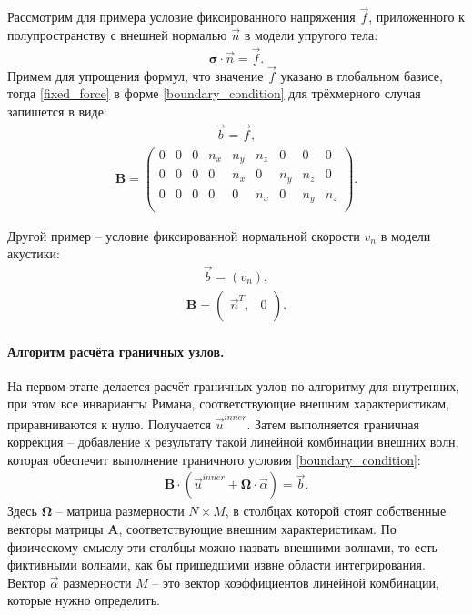 \documentclass[a4paper]{article}
\numberwithin{equation}{section}
\begin{document}
Рассмотрим для примера условие фиксированного напряжения $\vec{f}$, 
приложенного к полупространству с внешней нормалью $\vec{n}$ в модели упругого тела:
\begin{eqnarray}
\label{fixed_force}
	\mathbf{\sigma} \cdot \vec{n} = \vec{f}.
\end{eqnarray}
Примем для упрощения формул, что значение $\vec{f}$ указано в глобальном базисе,
тогда \eqref{fixed_force} в форме \eqref{boundary_condition} 
для трёхмерного случая запишется в виде: 
\begin{eqnarray}
	\vec{b} = \vec{f},
\end{eqnarray}
\begin{align}
\label{fixed_force_global_basis_3D}
	\mathbf{B} =
	\left( \begin{array}{cccccccccccc}
	 0 & 0 & 0 & n_x & n_y & n_z & 0 & 0 & 0 \\
	 0 & 0 & 0 & 0 & n_x & 0 & n_y & n_z & 0 \\
	 0 & 0 & 0 & 0 & 0 & n_x & 0 & n_y & n_z \\
	\end{array} \right).
\end{align}

Другой пример -- условие фиксированной нормальной скорости $v_n$ в модели акустики:
\begin{eqnarray}
	\vec{b} = (v_n),
\end{eqnarray}
\begin{align}
\label{fixed_normal_velocity_acoustic}
	\mathbf{B} =
	\left( \begin{array}{cccccccccccc}
	 \vec{n}^T, & 0 \\
	\end{array} \right).
\end{align}

\paragraph{Алгоритм расчёта граничных узлов.}
\label{sec:good-border-case}
На первом этапе делается расчёт граничных узлов по алгоритму для внутренних, 
при этом все инварианты Римана, соответствующие внешним характеристикам, приравниваются к нулю. 
Получается $\vec{u}^{inner}$. Затем выполняется граничная коррекция -- 
добавление к результату такой линейной комбинации внешних волн, 
которая обеспечит выполнение граничного условия \eqref{boundary_condition}:
\begin{eqnarray}
	\mathbf{B} \cdot (\vec{u}^{inner} + \mathbf{\Omega} \cdot \vec{\alpha}) = \vec{b}.
\end{eqnarray}
Здесь $\mathbf{\Omega}$ -- матрица размерности $N \times M$, 
в столбцах которой стоят собственные векторы 
матрицы $\mathbf{A}$, соответствующие внешним характеристикам.
По физическому смыслу эти столбцы можно назвать внешними волнами,
то есть фиктивными волнами, как бы пришедшими извне области интегрирования.
Вектор $\vec{\alpha}$ размерности $M$ -- это вектор
коэффициентов линейной комбинации, которые нужно определить.
\end{document}

